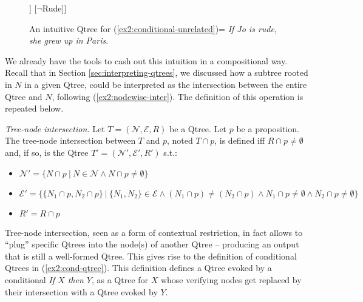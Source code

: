 \begin{figure}[H]
	\centering
	\begin{forest}
		[CS [Rude [Paris][Lyon][...][Berlin][...]] [$\neg$Rude]]
	\end{forest}
	\caption{An intuitive Qtree for (\ref{ex2:conditional-unrelated})= \textit{If Jo is rude, she grew up in Paris}.}\label{fig2:rude-paris-qtree}
\end{figure} 

We already have the tools to cash out this intuition in a compositional way. Recall that in Section \ref{sec:interpreting-qtrees}, we discussed how a subtree rooted in $N$ in a given Qtree, could be interpreted as the intersection between the entire Qtree and $N$, following (\ref{ex2:nodewise-inter}). The definition of this operation is repeated below.

\begin{exe}
	 {\textit{Tree-node intersection.} Let $T=(\mathcal{N}, \mathcal{E}, R)$ be a Qtree. Let $p$ be a proposition. The tree-node intersection between $T$ and $p$, noted $T \cap p$, is defined iff $R \cap p \neq \emptyset$ and, if so, is the Qtree $T'=(\mathcal{N}', \mathcal{E}', R')$ s.t.:
		\begin{itemize}
			\item $\mathcal{N}' = \lbrace N \cap p \ | \ N \in \mathcal{N} \wedge N \cap p \neq \emptyset\rbrace$
			\item $\mathcal{E}' = \lbrace \lbrace N_1\cap p, N_2\cap p\rbrace \ | \ \lbrace N_1, N_2\rbrace \in \mathcal{E} \wedge (N_1\cap p) \neq (N_2\cap p) \wedge N_1\cap p \neq \emptyset \wedge N_2\cap p \neq \emptyset \rbrace$
			\item $R' = R\cap p$
	\end{itemize}}
\end{exe} 

Tree-node intersection, seen as a form of contextual restriction, in fact allows to ``plug'' specific Qtrees into the node(s) of another Qtree -- producing an output that is still a well-formed Qtree. This gives rise to the definition of conditional Qtrees in 
(\ref{ex2:cond-qtree}). This definition defines a Qtree evoked by a conditional \textit{If $X$ then $Y$}, as a Qtree for $X$ whose verifying nodes get replaced by their intersection with a Qtree evoked by $Y$. 

